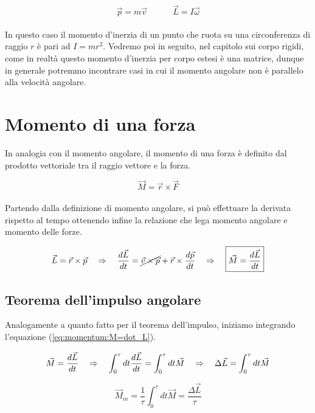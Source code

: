 \begin{equation}
\vec p = m\vec v \quad\quad \quad \vec L = I\vec\omega
\end{equation} 
\\
In questo caso il momento d'inerzia di un punto che ruota su una
circonferenza di raggio $r$ è pari ad $I = mr^2$. Vedremo poi in seguito,
nel capitolo sui corpo rigidi, come in realtà questo momento d'inerzia per
corpo estesi è una matrice, dunque in generale potremmo incontrare casi in
cui il momento angolare non è parallelo alla velocità angolare.

\section{Momento di una forza}
In analogia con il momento angolare, il momento di una forza è definito dal
prodotto vettoriale tra il raggio vettore e la forza.

\begin{equation}
    \boxed{\vec M = \vec r \times \vec F}
\label{eq:momentum:M_def}
\end{equation}
\\
Partendo dalla definizione di momento angolare, si può effettuare la derivata
rispetto al tempo ottenendo infine la relazione che lega momento angolare e
momento delle forze.

\begin{equation}
    \vec L = \vec r \times \vec p \quad\Rightarrow\quad \frac{d\vec L}{dt} =
    \cancel{\vec v\times\vec p} + \vec r \times \frac{d\vec p}{dt} \quad\Rightarrow\quad
    \boxed{\vec M = \frac{d\vec L}{dt}}
\label{eq:momentum:M=dot_L}
\end{equation}

\subsection{Teorema dell'impulso angolare}
Analogamente a quanto fatto per il teorema dell'impulso, iniziamo integrando
l'equazione (\ref{eq:momentum:M=dot_L}).

\begin{equation}
    \vec M = \frac{d\vec L}{dt} \quad\Rightarrow\quad \int_0^\tau dt\frac{d\vec L}{dt} = \int_0^\tau dt \vec M \quad\Rightarrow\quad \Delta \vec L =\int_0^\tau dt \vec M 
\end{equation}

\begin{equation}
    \vec{M}_m = \frac1\tau\int_0^\tau dt \vec M = \frac{\Delta \vec L}{\tau}
\end{equation}

